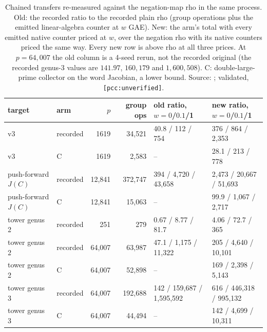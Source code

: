 \begin{table}[t]
\centering\footnotesize
\begin{tabular}{@{}llrrll@{}}
\toprule
target & arm & $p$ & group ops & old ratio, $w=0$/$0.1$/1 & new ratio, $w=0$/$0.1$/1 \\
\midrule
v3 & recorded & 1619 & 34{,}521 & 40.8 / 112 / 754 & 376 / 864 / 2{,}353 \\
v3 & C & 1619 & 2{,}583 & -- & 28.1 / 213 / 778 \\
push-forward $J(C)$ & recorded & 12{,}841 & 372{,}747 & 394 / 4{,}720 / 43{,}658 & 2{,}473 / 20{,}667 / 51{,}693 \\
push-forward $J(C)$ & C & 12{,}841 & 15{,}063 & -- & 99.9 / 1{,}067 / 2{,}717 \\
tower genus 2 & recorded & 251 & 279 & 0.67 / 8.77 / 81.7 & 4.06 / 72.7 / 365 \\
tower genus 2 & recorded & 64{,}007 & 63{,}987 & 47.1 / 1{,}175 / 11{,}322 & 205 / 4{,}640 / 10{,}101 \\
tower genus 2 & C & 64{,}007 & 52{,}898 & -- & 169 / 2{,}398 / 5{,}143 \\
tower genus 3 & recorded & 64{,}007 & 192{,}688 & 142 / 159{,}687 / 1{,}595{,}592 & 616 / 446{,}318 / 995{,}132 \\
tower genus 3 & C & 64{,}007 & 44{,}494 & -- & 142 / 4{,}699 / 10{,}311 \\
\bottomrule
\end{tabular}
\caption[]{Chained transfers re-measured against the negation-map rho in the
same process. Old: the recorded ratio to the recorded plain rho (group
operations plus the emitted linear-algebra counter at $w$ GAE). New: the
arm's total with every emitted native counter priced at $w$, over the
negation rho with its native counters priced the same way. Every new row is
above rho at all three prices. At $p=64{,}007$ the old column is a 4-seed
rerun, not the recorded original (the recorded genus-3 values are $141.97$,
$160{,}179$ and $1{,}600{,}508$). C: double-large-prime collector on the word
Jacobian, a lower bound. Source:
; validated,
\texttt{[pcc:unverified]}.}
\label{tab:jac-chain-neg}
\end{table}

